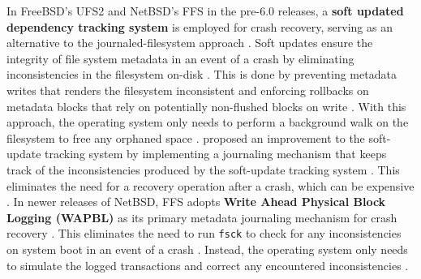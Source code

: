 In FreeBSD's UFS2 and NetBSD's FFS in the pre-6.0 releases, a \textbf{soft updated dependency tracking system} is employed for crash
recovery, serving as an alternative
to the journaled-filesystem approach \parencites{ganger1994}{mckusick1996}{netbsd_6.0}.
Soft updates ensure the integrity of file system metadata in an event of a crash by eliminating inconsistencies in the filesystem
on-disk \parencite{mckusick_ganger1999}. This is done by preventing metadata writes that renders the filesystem inconsistent and
enforcing rollbacks on metadata blocks that rely on potentially non-flushed blocks on write \parencite{mckusick_ganger1999}.
With this approach, the operating system only needs to perform a background walk on the filesystem to free any orphaned space
\parencite{mckusick_ganger1999}. \textcite{mckusick2012} proposed an improvement to the
soft-update tracking system by implementing a journaling mechanism that keeps track of the inconsistencies produced by the
soft-update tracking system \parencite{mckusick2012}. This eliminates the need for a recovery operation after a crash, which
can be expensive \parencite{mckusick2002}.
In newer releases of NetBSD, FFS adopts \textbf{Write Ahead Physical Block Logging (WAPBL)} as its primary metadata journaling mechanism
for crash recovery \parencites{biancuzzi2010}{mcneill2008}. This eliminates the need to run \texttt{fsck} to check for any
inconsistencies on system boot in an event of a crash \parencite{netbsd_wapbl}. Instead, the operating system only needs to
simulate the logged transactions and correct any encountered inconsistencies \parencite{netbsd_wapbl}.

